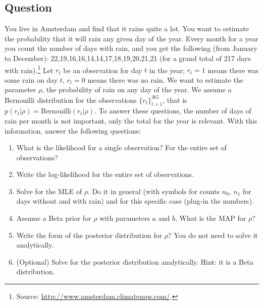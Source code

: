 \documentclass[12pt,a4paper]{article}
\begin{document}
\subsection{Question}
You live in Amsterdam and find that it rains quite a lot.  You want to estimate the probability that it will rain any given day of the year.  Every month for a year you count the number of days with rain, and you get the following (from January to December): 22,19,16,16,14,14,17,18,19,20,21,21 (for a grand total of 217 days with rain).\footnote{Source: \url{http://www.amsterdam.climatemps.com/}.}  Let $r_t$ be an observation for day $t$ in the year; $r_t=1$ means there was some rain on day $t$, $r_t=0$ means there was no rain.  We want to estimate the parameter $\rho$, the probability of rain on any day of the year.  We assume a Bernouilli distribution for the observations $\{r_t\}_{t=1}^{365}$, that is $p( r_t | \rho ) = \text{Bernouilli}(r_t | \rho)$.  To answer these questions, the number of days of rain per month is not important, only the total for the year is relevant.  With this information, answer the following questions:
\begin{enumerate}
  \item What is the likelihood for a single observation?  For the entire set of observations? 
  \item Write the log-likelihood for the entire set of observations.  
  \item Solve for the MLE of $\rho$.  Do it in general (with symbols for counts $n_0$, $n_1$ for days without and with rain) and for this specific case (plug-in the numbers).
  \item Assume a Beta prior for $\rho$ with parameters $a$ and $b$.  What is the MAP for $\rho$?
  \item Write the form of the posterior distribution for $\rho$?  You do not need to solve it analytically.
  \item (Optional) Solve for the posterior distribution analytically.  Hint: it is a Beta distribution.
\end{enumerate}
\end{document}

